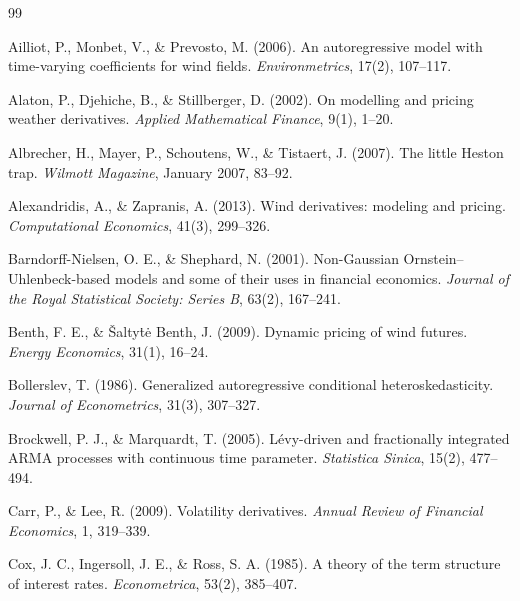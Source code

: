 \begin{thebibliography}{99}

Ailliot, P., Monbet, V., \& Prevosto, M. (2006).
An autoregressive model with time-varying coefficients for wind fields.
\textit{Environmetrics}, 17(2), 107--117.

Alaton, P., Djehiche, B., \& Stillberger, D. (2002).
On modelling and pricing weather derivatives.
\textit{Applied Mathematical Finance}, 9(1), 1--20.

Albrecher, H., Mayer, P., Schoutens, W., \& Tistaert, J. (2007).
The little Heston trap.
\textit{Wilmott Magazine}, January 2007, 83--92.

Alexandridis, A., \& Zapranis, A. (2013).
Wind derivatives: modeling and pricing.
\textit{Computational Economics}, 41(3), 299--326.

Barndorff-Nielsen, O. E., \& Shephard, N. (2001).
Non-Gaussian Ornstein--Uhlenbeck-based models and some of their uses in financial economics.
\textit{Journal of the Royal Statistical Society: Series B}, 63(2), 167--241.

Benth, F. E., \& \v{S}alty\.{t}\.{e} Benth, J. (2009).
Dynamic pricing of wind futures.
\textit{Energy Economics}, 31(1), 16--24.

Bollerslev, T. (1986).
Generalized autoregressive conditional heteroskedasticity.
\textit{Journal of Econometrics}, 31(3), 307--327.

Brockwell, P. J., \& Marquardt, T. (2005).
L\'evy-driven and fractionally integrated ARMA processes with continuous time parameter.
\textit{Statistica Sinica}, 15(2), 477--494.

Carr, P., \& Lee, R. (2009).
Volatility derivatives.
\textit{Annual Review of Financial Economics}, 1, 319--339.

Cox, J. C., Ingersoll, J. E., \& Ross, S. A. (1985).
A theory of the term structure of interest rates.
\textit{Econometrica}, 53(2), 385--407.


\end{thebibliography}
